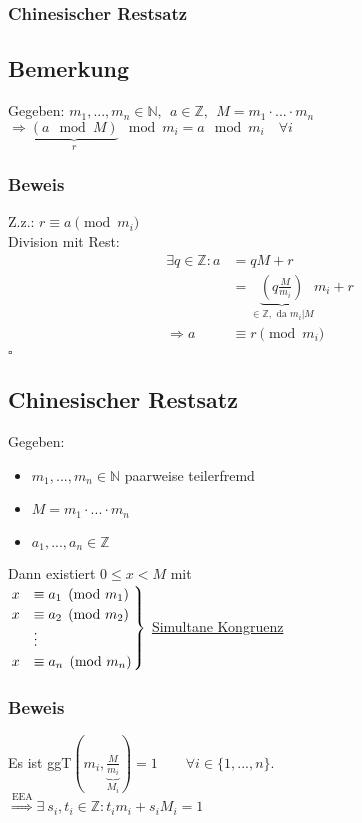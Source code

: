 \documentclass[12pt,titlepage, pdf]{article}
\newcommand{\uline}[1]{\underline{#1}}
\newcommand{\qed}{\hfill$\square$}
\renewcommand{\>}{\rightarrow}
\renewcommand{\*}{\cdot}
\renewenvironment{rcases}{%
	\left.\renewcommand*\lbrace.%
	\begin{cases}}%
	{\end{cases}\right\rbrace}
\begin{document}
\subsubsection*{Chinesischer Restsatz}
\subsection{Bemerkung}
\label{4.10}
Gegeben: $m_1,...,m_n \in \mathbb{N},~~ a \in \mathds{Z},~~ M = m_1 \cdot ... \cdot m_n$ \\
\noindent\hspace*{11mm}$\Rightarrow\underbrace{(a \mod M)}_{r} \mod m_i = a \mod m_i \quad\forall i$
\subsubsection*{Beweis}
Z.z.: $r \equiv a \pmod {m_i}$\\
Division mit Rest: 
\begin{align*}
\exists q \in \mathbb{Z}: a &= qM + r \\
&= \underbrace{(q \frac{M}{m_i})}_{\in \mathbb{Z}, \text{ da } m_i \vert M} m_i + r \\
\Rightarrow a &\equiv r \pmod{m_i} \\
\end{align*}
\qed
\subsection{Chinesischer Restsatz}
\label{4.11}
Gegeben:
\begin{itemize}
	\item $m_1,...,m_n \in \mathbb{N}$ paarweise teilerfremd
	\item $M = m_1 \cdot ... \cdot m_n$
	\item $a_1,...,a_n \in \mathbb{Z}$
\end{itemize}
Dann existiert $0 \leq x < M$ mit \\

$\begin{rcases}
x &\equiv a_1 \pmod{m_1} \\
x &\equiv a_2 \pmod{m_2} \\
&\vdots \\
x &\equiv a_n \pmod{m_n} \\
\end{rcases}$ \uline{Simultane Kongruenz} 

\subsubsection*{Beweis}
Es ist ggT$(m_i, \underbrace{\frac{M}{m_i}}_{M_i}) = 1 \qquad \forall i \in \{1,...,n\}$. \\
$\overset{\text{EEA}}{\Rightarrow } \exists~ s_i, t_i \in \mathbb{Z}: t_i m_i + s_i M_i = 1$ \\
\end{document}
